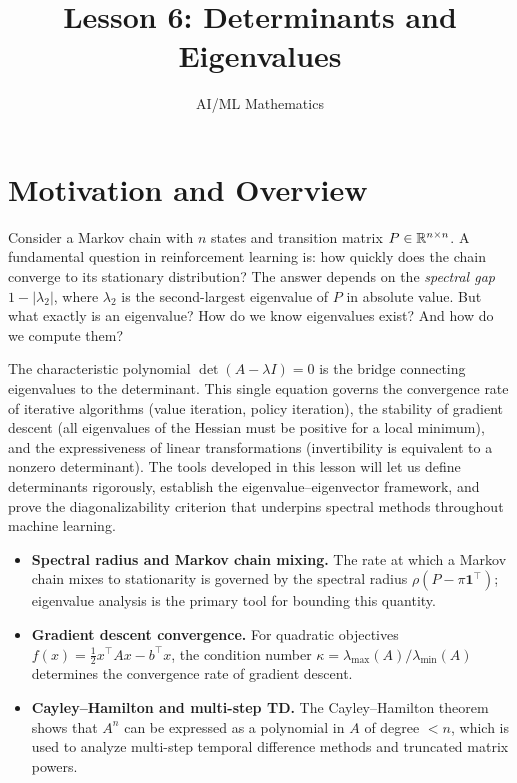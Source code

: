 \documentclass[11pt,a4paper]{article}
\title{Lesson 6: Determinants and Eigenvalues}
\author{AI/ML Mathematics}
\date{}
\begin{document}
\maketitle
\tableofcontents
\newpage

\section{Motivation and Overview}
\label{sec:motivation}

Consider a Markov chain with $n$ states and transition matrix
$P \in \mathbb{R}^{n \times n}$.  A fundamental question in reinforcement learning
is: how quickly does the chain converge to its stationary distribution?
The answer depends on the \emph{spectral gap} $1 - |\lambda_2|$, where
$\lambda_2$ is the second-largest eigenvalue of $P$ in absolute value.
But what exactly is an eigenvalue?  How do we know eigenvalues exist?
And how do we compute them?

The characteristic polynomial $\det(A - \lambda I) = 0$ is the bridge
connecting eigenvalues to the determinant.  This single equation governs
the convergence rate of iterative algorithms (value iteration, policy
iteration), the stability of gradient descent (all eigenvalues of the
Hessian must be positive for a local minimum), and the expressiveness of
linear transformations (invertibility is equivalent to a nonzero determinant).
The tools developed in this lesson will let us define determinants rigorously,
establish the eigenvalue--eigenvector framework, and prove the
diagonalizability criterion that underpins spectral methods throughout
machine learning.

\begin{rlconnection}[title={Where Determinants and Eigenvalues Appear in RL/ML}]
\begin{itemize}[nosep]
  \item \textbf{Spectral radius and Markov chain mixing.}
        The rate at which a Markov chain mixes to stationarity is governed by
        the spectral radius $\rho(P - \pi \mathbf{1}^\top)$; eigenvalue
        analysis is the primary tool for bounding this quantity.
  \item \textbf{Gradient descent convergence.}
        For quadratic objectives $f(x) = \tfrac{1}{2} x^\top A x - b^\top x$,
        the condition number $\kappa = \lambda_{\max}(A)/\lambda_{\min}(A)$
        determines the convergence rate of gradient descent.
  \item \textbf{Cayley--Hamilton and multi-step TD.}
        The Cayley--Hamilton theorem shows that $A^n$ can be expressed as a
        polynomial in $A$ of degree $< n$, which is used to analyze
        multi-step temporal difference methods and truncated matrix powers.
\end{itemize}
\end{rlconnection}
\end{document}
